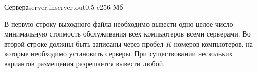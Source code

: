 \begin{problem}{Сервера}{server.in}{server.out}{0.5 c}{256 Мб}
\OutputFile

В первую строку выходного файла необходимо вывести одно целое число --- минимальную стоимость обслуживания всех компьютеров всеми серверами. Во второй строке должны быть записаны через пробел $K$ номеров компьютеров, на которые необходимо установить серверы. При существовании нескольких вариантов размещения разрешается вывести любой.

\Example

\begin{example}
%
%
\end{example}

\end{problem}
